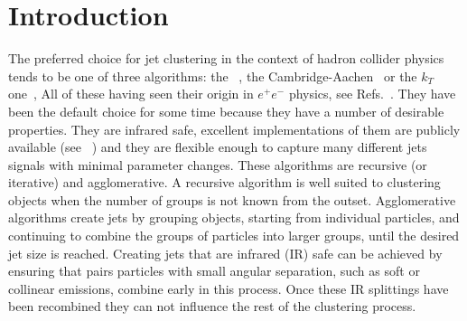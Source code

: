 \section{Introduction}\label{sec:JetClustering}

The preferred choice for jet clustering in the context of hadron collider physics tends to be one of three algorithms:  
the \antikt{}~\cite{Cacciari:2008gp},
the Cambridge-Aachen~\cite{Dokshitzer:1997in,Wobisch:1998wt} or the $k_T$  one~\cite{Ellis:1993tq},
All of these having seen  their origin in $e^+e^-$ physics, see  Refs.~\cite{Sterman:1977wj,Bethke:1991wk,Catani:1991hj,Moretti:1998qx}.
They have been the default choice for some time because they have a number of desirable properties.
They are infrared safe, excellent implementations of them are publicly available (see \fastjet{}~\cite{Cacciari:2011ma})
and they are flexible enough to capture many different jets signals with minimal parameter changes.
These algorithms are recursive (or iterative) and agglomerative.
A recursive algorithm is well suited to clustering objects when the number of groups is not known from the outset.
Agglomerative algorithms create jets by grouping objects,
starting from individual particles,
and continuing to combine the groups of particles into larger groups,
until the desired jet size is reached.
Creating jets that are infrared (IR) safe
can be achieved by ensuring that pairs particles with small angular separation,
such as soft or collinear emissions, combine early in this process.
Once these IR splittings have been recombined they
can not influence the rest of the clustering process.

% 

